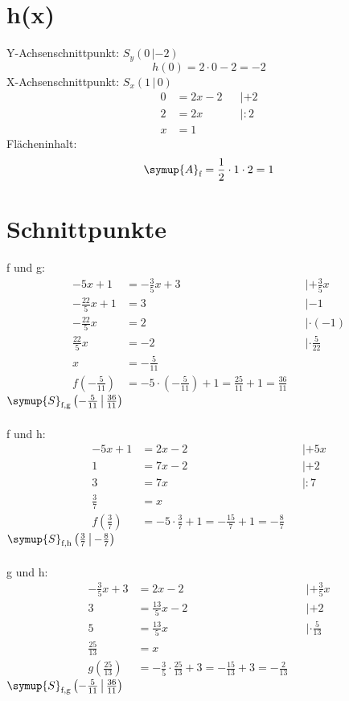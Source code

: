 \section*{h(x)}
Y-Achsenschnittpunkt: $S_y (0\,|-2)$
\begin{equation}
      h(0) = 2\cdot0 - 2 = -2
\end{equation}
X-Achsenschnittpunkt: $S_x (1\,|\,0)$
\begin{align}
      0 &= 2x - 2 && | +2 \\
      2 &= 2x && | :2\\
      x &= 1
\end{align}
Flächeninhalt:
\begin{equation}
      \symup{A}_\text{f} = \frac{1}{2} \cdot 1 \cdot 2 = 1
\end{equation}

\section*{Schnittpunkte}
f und g:
\begin{align}
    -5x + 1 &= -\frac{3}{5}x + 3 && | +\frac{3}{5}x \\
    -\frac{22}{5}x + 1 &= 3 && | -1 \\
    -\frac{22}{5}x &= 2 && | \cdot\!(-1) \\
    \frac{22}{5}x &= -2 && | \cdot\!\frac{5}{22} \\
    x &= -\frac{5}{11} \\
    f\left( -\frac{5}{11} \right) &= -5\cdot \left( -\frac{5}{11} \right) +1
        = \frac{25}{11} +1 = \frac{36}{11}
\end{align}
$\symup{S}_\text{f,g}\left(-\frac{5}{11}\,\middle|\,\frac{36}{11}\right)$\\\\
f und h:
\begin{align}
    -5x + 1 &= 2x - 2 && | +5x \\
    1 &= 7x - 2 && | +2 \\
    3 &= 7x && | :7 \\
    \frac{3}{7} &= x \\
    f\left(\frac{3}{7}\right) &= -5\cdot \frac{3}{7} +1
        = -\frac{15}{7} +1 = -\frac{8}{7}
\end{align}
$\symup{S}_\text{f,h}\left(\frac{3}{7}\,\middle|\,-\frac{8}{7}\right)$\\\\
g und h:
\begin{align}
    -\frac{3}{5}x + 3& = 2x - 2 && | +\frac{3}{5}x \\
    3 &= \frac{13}{5}x -2 && | +2 \\
    5 &= \frac{13}{5}x && | \cdot\!\frac{5}{13} \\
    \frac{25}{13} &= x \\
    g\left(\frac{25}{13}\right) &= -\frac{3}{5} \cdot \frac{25}{13} +3
        = -\frac{15}{13} +3 = -\frac{2}{13}
\end{align}
$\symup{S}_\text{f,g}\left(-\frac{5}{11}\,\middle|\,\frac{36}{11}\right)$


